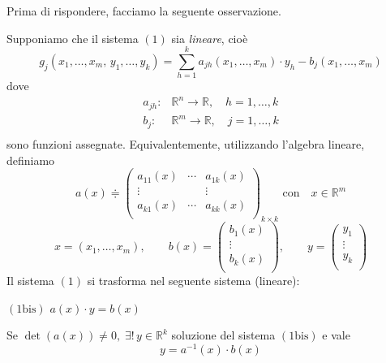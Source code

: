 Prima di rispondere, facciamo la seguente osservazione.

\begin{obs}
Supponiamo che il sistema $\mathrm{(1)}$ sia \emph{lineare}, cioè
$$
g_j(x_1,\ldots,x_m,\,y_1,\ldots,y_k) = \sum_{h=1}^{k} a_{jh}(x_1,\ldots,x_m) \cdot y_h - b_j(x_1,\ldots,x_m)
$$
dove
$$
\begin{array}{rl}
a_{jh} :& \mathbb{R}^n \longrightarrow \mathbb{R}, \quad h = 1,\ldots,k\\
b_j :& \mathbb{R}^m \longrightarrow \mathbb{R}, \quad j = 1,\ldots,k\\
\end{array}
$$
sono funzioni assegnate. Equivalentemente, utilizzando l'algebra lineare, definiamo
$$
a(x) \doteqdot \left(
\begin{array}{ccc}
a_{11}(x) & \cdots & a_{1k}(x)\\
\vdots & & \vdots\\
a_{k1}(x) & \cdots & a_{kk}(x)\\
\end{array}
\right)_{k \times k}
\text{ con} \quad
x \in \mathbb{R}^m
$$
$$
x = (x_1,\ldots,x_m), \qquad
b(x) = \left(
\begin{array}{c}
b_1(x)\\
\vdots\\
b_k(x)\\
\end{array}
\right), \qquad
y = \left(
\begin{array}{c}
y_1\\
\vdots\\
y_k\\
\end{array}
\right)
$$
Il sistema $\mathrm{(1)}$ si trasforma nel seguente sistema (lineare):
\begin{center}
$\mathrm{(1bis)}$
\hfill
$\displaystyle
a(x) \cdot y = b(x)
$
\hfill \null \\
\end{center}
Se $\det(a(x)) \neq 0, \; \exists ! \, y \in \mathbb{R}^k$ soluzione del sistema $\mathrm{(1bis)}$ e vale
$$
y = a^{-1}(x) \cdot b(x)
$$
\end{obs}

